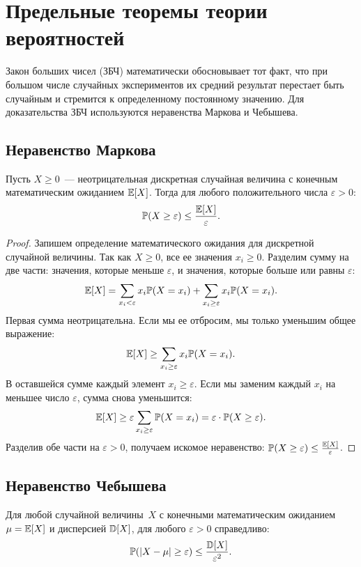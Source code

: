 \section{Предельные теоремы теории вероятностей}

Закон больших чисел (ЗБЧ) математически обосновывает тот факт, что при большом числе случайных экспериментов их средний результат перестает быть случайным и стремится к определенному постоянному значению. Для доказательства ЗБЧ используются неравенства Маркова и Чебышева.

\subsection{Неравенство Маркова}
\begin{theorem}
Пусть $X \ge 0$~--- неотрицательная дискретная случайная величина с конечным математическим ожиданием $\mathbb{E}[X]$. Тогда для любого положительного числа $\varepsilon > 0$:
\[
\mathbb{P}(X \ge \varepsilon) \le \frac{\mathbb{E}[X]}{\varepsilon}.
\]
\end{theorem}

\begin{proof}
Запишем определение математического ожидания для дискретной случайной величины. Так как $X \ge 0$, все ее значения $x_i \ge 0$.
Разделим сумму на две части: значения, которые меньше $\varepsilon$, и значения, которые больше или равны $\varepsilon$:
\[
\mathbb{E}[X] = \sum_{x_i < \varepsilon} x_i \mathbb{P}(X = x_i) + \sum_{x_i \ge \varepsilon} x_i \mathbb{P}(X = x_i).
\]
Первая сумма неотрицательна. Если мы ее отбросим, мы только уменьшим общее выражение:
\[
\mathbb{E}[X] \ge \sum_{x_i \ge \varepsilon} x_i \mathbb{P}(X = x_i).
\]
В оставшейся сумме каждый элемент $x_i \ge \varepsilon$. Если мы заменим каждый $x_i$ на меньшее число $\varepsilon$, сумма снова уменьшится:
\[
\mathbb{E}[X] \ge \varepsilon \sum_{x_i \ge \varepsilon} \mathbb{P}(X = x_i) = \varepsilon \cdot \mathbb{P}(X \ge \varepsilon).
\]
Разделив обе части на $\varepsilon > 0$, получаем искомое неравенство: $\mathbb{P}(X \ge \varepsilon) \le \frac{\mathbb{E}[X]}{\varepsilon}$.
\end{proof}

\subsection{Неравенство Чебышева}
\begin{theorem}
Для любой случайной величины~$X$ с конечными математическим ожиданием $\mu = \mathbb{E}[X]$ и дисперсией $\mathbb{D}[X]$, для любого $\varepsilon > 0$ справедливо:
\[
\mathbb{P}(\lvert X - \mu\rvert \ge \varepsilon) \le \frac{\mathbb{D}[X]}{\varepsilon^2}.
\]
\end{theorem}

